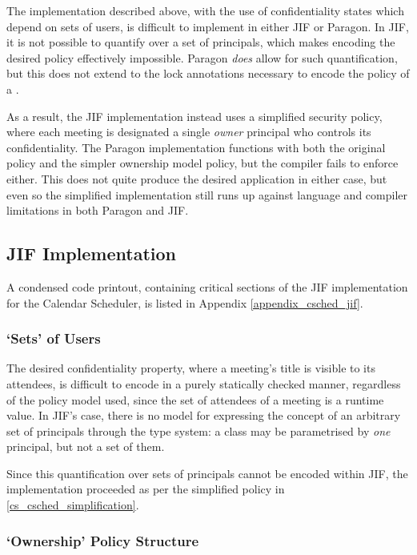 The implementation described above, with the use of confidentiality states which depend on sets of users, is difficult to implement in either JIF or Paragon. In JIF, it is not possible to quantify over a set of principals, which makes encoding the desired policy effectively impossible. Paragon \textit{does} allow for such quantification, but this does not extend to the lock annotations necessary to encode the policy of a .

As a result, the JIF implementation instead uses a simplified security policy, where each meeting is designated a single \textit{owner} principal who controls its confidentiality. The Paragon implementation functions with both the original policy and the simpler ownership model policy, but the compiler fails to enforce either. This does not quite produce the desired application in either case, but even so the simplified implementation still runs up against language and compiler limitations in both Paragon and JIF.

\subsection{JIF Implementation}

A condensed code printout, containing critical sections of the JIF implementation for the Calendar Scheduler, is listed in Appendix \ref{appendix_csched_jif}.

\subsubsection{`Sets' of Users}

The desired confidentiality property, where a meeting's title is visible to its attendees, is difficult to encode in a purely statically checked manner, regardless of the policy model used, since the set of attendees of a meeting is a runtime value. In JIF's case, there is no model for expressing the concept of an arbitrary set of principals through the type system: a class may be parametrised by \textit{one} principal, but not a set of them.

Since this quantification over sets of principals cannot be encoded within JIF, the implementation proceeded as per the simplified policy in \ref{cs_csched_simplification}.

\subsubsection{`Ownership' Policy Structure}

